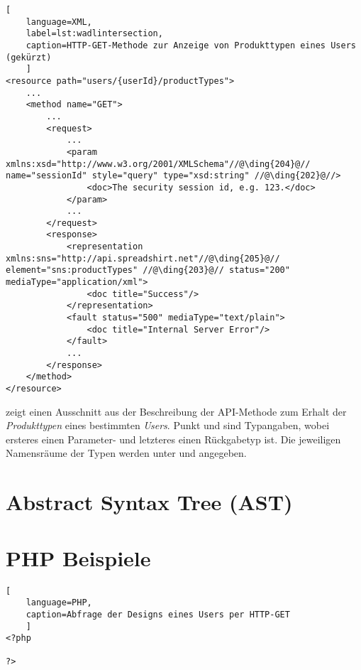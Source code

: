 \begin{lstlisting}[
    language=XML,
    label=lst:wadlintersection,
    caption=HTTP-GET-Methode zur Anzeige von Produkttypen eines Users (gekürzt)
    ]
<resource path="users/{userId}/productTypes">
    ...
    <method name="GET">
        ...
        <request>
            ...
            <param xmlns:xsd="http://www.w3.org/2001/XMLSchema"//@\ding{204}@// name="sessionId" style="query" type="xsd:string" //@\ding{202}@//>
                <doc>The security session id, e.g. 123.</doc>
            </param>
            ...
        </request>
        <response>
            <representation xmlns:sns="http://api.spreadshirt.net"//@\ding{205}@// element="sns:productTypes" //@\ding{203}@// status="200" mediaType="application/xml">
                <doc title="Success"/>
            </representation>
            <fault status="500" mediaType="text/plain">
                <doc title="Internal Server Error"/>
            </fault>
            ...
        </response>
    </method>
</resource>
\end{lstlisting}

 zeigt einen Ausschnitt aus der Beschreibung der API-Methode zum Erhalt der \emph{Produkttypen} eines bestimmten \emph{Users}. Punkt  und  sind Typangaben, wobei ersteres einen Parameter- und letzteres einen Rückgabetyp ist. Die jeweiligen Namensräume der Typen werden unter  und  angegeben.


\section{Abstract Syntax Tree (AST)}

\section{PHP Beispiele}

\begin{lstlisting}[
    language=PHP,
    caption=Abfrage der Designs eines Users per HTTP-GET
    ]
<?php

?>
\end{lstlisting}
